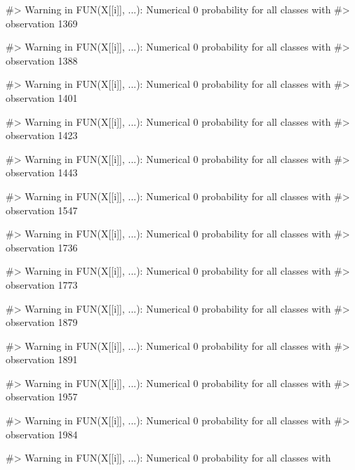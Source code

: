 \begin{Schunk}
\begin{Soutput}
#> Warning in FUN(X[[i]], ...): Numerical 0 probability for all classes with
#> observation 1369
\end{Soutput}
\begin{Soutput}
#> Warning in FUN(X[[i]], ...): Numerical 0 probability for all classes with
#> observation 1388
\end{Soutput}
\begin{Soutput}
#> Warning in FUN(X[[i]], ...): Numerical 0 probability for all classes with
#> observation 1401
\end{Soutput}
\begin{Soutput}
#> Warning in FUN(X[[i]], ...): Numerical 0 probability for all classes with
#> observation 1423
\end{Soutput}
\begin{Soutput}
#> Warning in FUN(X[[i]], ...): Numerical 0 probability for all classes with
#> observation 1443
\end{Soutput}
\begin{Soutput}
#> Warning in FUN(X[[i]], ...): Numerical 0 probability for all classes with
#> observation 1547
\end{Soutput}
\begin{Soutput}
#> Warning in FUN(X[[i]], ...): Numerical 0 probability for all classes with
#> observation 1736
\end{Soutput}
\begin{Soutput}
#> Warning in FUN(X[[i]], ...): Numerical 0 probability for all classes with
#> observation 1773
\end{Soutput}
\begin{Soutput}
#> Warning in FUN(X[[i]], ...): Numerical 0 probability for all classes with
#> observation 1879
\end{Soutput}
\begin{Soutput}
#> Warning in FUN(X[[i]], ...): Numerical 0 probability for all classes with
#> observation 1891
\end{Soutput}
\begin{Soutput}
#> Warning in FUN(X[[i]], ...): Numerical 0 probability for all classes with
#> observation 1957
\end{Soutput}
\begin{Soutput}
#> Warning in FUN(X[[i]], ...): Numerical 0 probability for all classes with
#> observation 1984
\end{Soutput}
\begin{Soutput}
#> Warning in FUN(X[[i]], ...): Numerical 0 probability for all classes with

\end{Soutput}
\end{Schunk}

